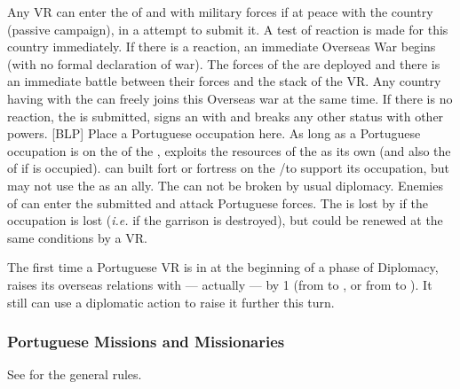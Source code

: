 \bparag Any VR can enter the \COL of  and  with
military forces if at peace with the country (passive campaign), in a
attempt to submit it. A test of reaction is made for this country
immediately.
\bparag If there is a reaction, an immediate Overseas War begins (with
no formal declaration of war). The forces of the \MIN are deployed and
there is an immediate battle between their forces and the stack of the
VR. Any country having \dipAT with the \MIN can freely joins this
Overseas war at the same time.
\bparag If there is no reaction, the \MIN is submitted, signs an
\dipAT with \POR and breaks any other status with other powers. [BLP]
Place a Portuguese occupation here. As long as a Portuguese occupation
is on the \COL of the \MIN, \POR exploits the resources of the \COL as
its own (and also the \TP of  if  is
occupied). \POR can built fort or fortress on the \COL/\TP to support
its occupation, but may not use the \MIN as an ally. The \dipAT can
not be broken by usual diplomacy.
\bparag Enemies of \POR can enter the submitted \MIN and attack
Portuguese forces. The \dipAT is lost by \POR if the occupation is
lost (\emph{i.e.} if the garrison is destroyed), but could be renewed
at the same conditions by a VR.

\bparag The first time a Portuguese VR is in  at the
beginning of a phase of Diplomacy, \POR raises its overseas relations
with  --- actually  --- by 1 (from \dipNR to \dipFR,
or from \dipFR to \dipAT). It still can use a diplomatic action to raise
it further this turn.

\subsubsection{Portuguese Missions and Missionaries}
\aparag See  for the general rules.


